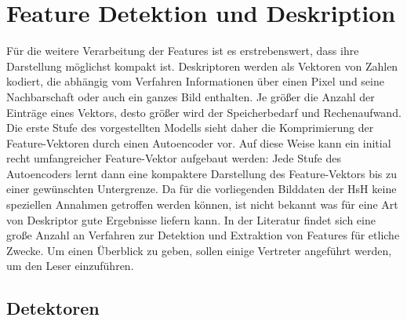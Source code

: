 \section{Feature Detektion und Deskription}
\label{extraction}

Für die weitere Verarbeitung der Features ist es erstrebenswert, dass ihre Darstellung möglichst kompakt ist. Deskriptoren werden als Vektoren von Zahlen kodiert, die abhängig vom Verfahren Informationen über einen Pixel und seine Nachbarschaft oder auch ein ganzes Bild enthalten. Je größer die Anzahl der Einträge eines Vektors, desto größer wird der Speicherbedarf und Rechenaufwand.
Die erste Stufe des vorgestellten Modells sieht daher die Komprimierung der Feature-Vektoren durch einen Autoencoder vor. Auf diese Weise kann ein initial recht umfangreicher Feature-Vektor aufgebaut werden: Jede Stufe des Autoencoders lernt dann eine kompaktere Darstellung des Feature-Vektors bis zu einer gewünschten Untergrenze.\newline
Da für die vorliegenden Bilddaten der HsH keine speziellen Annahmen getroffen werden können, ist nicht bekannt was für eine Art von Deskriptor gute Ergebnisse liefern kann. In der Literatur findet sich eine große Anzahl an Verfahren zur Detektion und Extraktion von Features für etliche Zwecke. Um einen Überblick zu geben, sollen einige Vertreter angeführt werden, um den Leser einzuführen.

\subsection{Detektoren}

